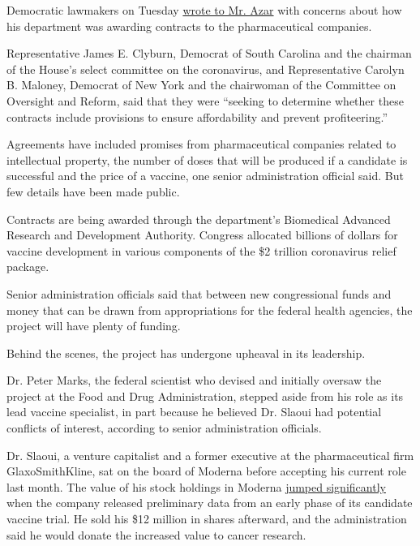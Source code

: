Democratic lawmakers on Tuesday
\href{https://oversight.house.gov/sites/democrats.oversight.house.gov/files/2020-06-02.Clyburn\%20CBM\%20to\%20HHS\%20re\%20Vaccine\%20and\%20Treatment\%20Contracts.pdf}{wrote
to Mr. Azar} with concerns about how his department was awarding
contracts to the pharmaceutical companies.

Representative James E. Clyburn, Democrat of South Carolina and the
chairman of the House's select committee on the coronavirus, and
Representative Carolyn B. Maloney, Democrat of New York and the
chairwoman of the Committee on Oversight and Reform, said that they were
``seeking to determine whether these contracts include provisions to
ensure affordability and prevent profiteering.''

Agreements have included promises from pharmaceutical companies related
to intellectual property, the number of doses that will be produced if a
candidate is successful and the price of a vaccine, one senior
administration official said. But few details have been made public.

Contracts are being awarded through the department's Biomedical Advanced
Research and Development Authority. Congress allocated billions of
dollars for vaccine development in various components of the \$2
trillion coronavirus relief package.

Senior administration officials said that between new congressional
funds and money that can be drawn from appropriations for the federal
health agencies, the project will have plenty of funding.

Behind the scenes, the project has undergone upheaval in its leadership.

Dr. Peter Marks, the federal scientist who devised and initially oversaw
the project at the Food and Drug Administration, stepped aside from his
role as its lead vaccine specialist, in part because he believed Dr.
Slaoui had potential conflicts of interest, according to senior
administration officials.

Dr. Slaoui, a venture capitalist and a former executive at the
pharmaceutical firm GlaxoSmithKline, sat on the board of Moderna before
accepting his current role last month. The value of his stock holdings
in Moderna
\href{https://www.nytimes.com/2020/05/20/health/coronavirus-vaccine-czar.html}{jumped
significantly} when the company released preliminary data from an early
phase of its candidate vaccine trial. He sold his \$12 million in shares
afterward, and the administration said he would donate the increased
value to cancer research.

